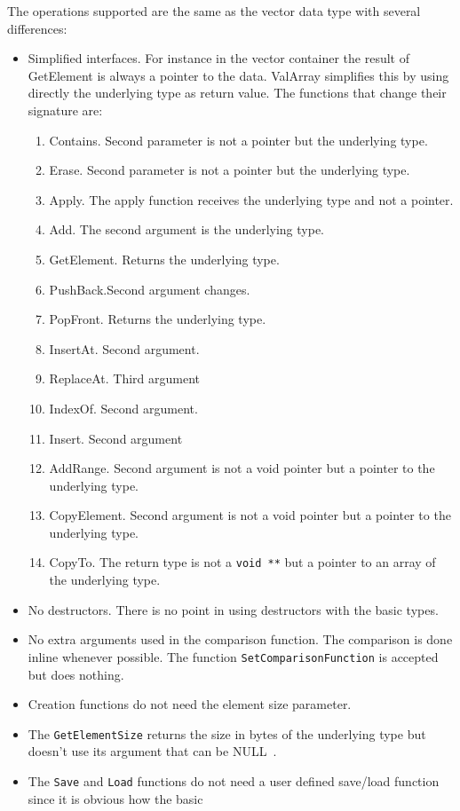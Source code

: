 \documentclass[12pt,a4paper]{memoir} %
\newif\iftth
\newcommand{\Null}{{\iftth \ NULL \else \footnotesize NULL\  \fi}}
\begin{document}
{{The operations supported are the same as the vector data type with several differences:
\begin{itemize}
\item Simplified interfaces. For instance in the vector container the result of GetElement is always a pointer to the data. ValArray simplifies this by
using directly the underlying type as return value. The functions that change their signature are:
\begin{enumerate}
\item Contains. Second parameter is not a pointer but the underlying type.
\item Erase. Second parameter is not a pointer but the underlying type.
\item Apply. The apply function receives the underlying type and not a pointer.
\item Add. The second argument is the underlying type.
\item GetElement. Returns the underlying type.
\item PushBack.Second argument changes.
\item PopFront. Returns the underlying type.
\item InsertAt. Second argument.
\item ReplaceAt. Third argument
\item IndexOf. Second argument.
\item Insert. Second argument
\item AddRange. Second argument is not a void pointer but a pointer to the underlying type.
\item CopyElement. Second argument is not a void pointer but a pointer to the underlying type.
\item CopyTo. The return type is not a \texttt{void **} but a pointer to an array of the underlying type.
\end{enumerate}
\item No destructors. There is no point in using destructors with the basic types.
\item No extra arguments used in the comparison function. The comparison is done inline whenever possible. The function \texttt{SetComparisonFunction}
is accepted but does nothing.
\item Creation functions do not need the element size parameter.
\item The \texttt{GetElementSize} returns the size in bytes of the underlying type but doesn't use its argument that can be \Null.
\item The \texttt{Save} and \texttt{Load} functions do not need a user defined save/load function since it is obvious how the basic

\end{itemize}}}
\end{document}
